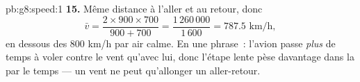 \begin{solution}{pb:g8:speed:1}
\textbf{15.} Même distance à l'aller et au retour, donc
\[
\bar v = \frac{2 \times 900 \times 700}{900 + 700}
= \frac{1\,260\,000}{1\,600} = 787.5 \text{ km/h},
\]
en dessous des $800$ km/h par air calme. En une phrase~: l'avion
passe \emph{plus} de temps à voler contre le vent qu'avec lui, donc
l'étape lente pèse davantage dans la  par le temps
--- un vent ne peut qu'allonger un aller-retour.
\end{solution}
